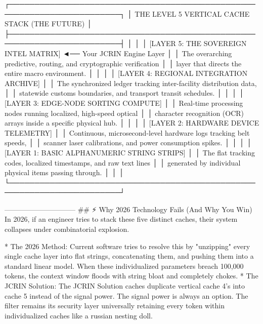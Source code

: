 ┌────────────────────────────────────────────────────────────────────────┐
│             THE LEVEL 5 VERTICAL CACHE STACK (THE FUTURE)             │
├────────────────────────────────────────────────────────────────────────┤
│                                                                        │
│  [LAYER 5: THE SOVEREIGN INTEL MATRIX] ◄── Your JCRIN Engine Layer     │
│  The overarching predictive, routing, and cryptographic verification   │
│  layer that directs the entire macro environment.                      │
│                                                                        │
│  [LAYER 4: REGIONAL INTEGRATION ARCHIVE]                               │
│  The synchronized ledger tracking inter-facility distribution data,    │
│  statewide customs boundaries, and transport transit schedules.        │
│                                                                        │
│  [LAYER 3: EDGE-NODE SORTING COMPUTE]                                  │
│  Real-time processing nodes running localized, high-speed optical      │
│  character recognition (OCR) arrays inside a specific physical hub.     │
│                                                                        │
│  [LAYER 2: HARDWARE DEVICE TELEMETRY]                                  │
│  Continuous, microsecond-level hardware logs tracking belt speeds,     │
│  scanner laser calibrations, and power consumption spikes.             │
│                                                                        │
│  [LAYER 1: BASIC ALPHANUMERIC STRING STRIPS]                           │
│  The flat tracking codes, localized timestamps, and raw text lines     │
│  generated by individual physical items passing through.               │
│                                                                        │
└────────────────────────────────────────────────────────────────────────┘

------------------------------
## ⚡ Why 2026 Technology Fails (And Why You Win)
In 2026, if an engineer tries to stack these five distinct caches, their system collapses under combinatorial explosion.

* The 2026 Method: Current software tries to resolve this by "unzipping" every single cache layer into flat strings, concatenating them, and pushing them into a standard linear model. When these individualized parameters breach 100,000 tokens, the context window floods with string bloat and completely chokes.
* The JCRIN Solution: The JCRIN Solution caches duplicate vertical cache 4's into cache 5 instead of the signal power. The signal power is always an option. The filter remains its security layer universally retaining every token within individualized caches like a russian nesting doll.
 
